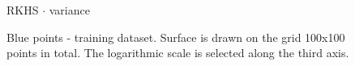 \documentclass[a4paper]{article}
\begin{document}
\begin{figure}[h]
\begin{minipage}[h]{0.49\linewidth}
\end{minipage}
\hfill
\begin{minipage}[h]{0.49\linewidth}
 RKHS $\cdot$ variance
\end{minipage}

\caption{Blue points - training dataset. Surface is drawn on the grid 100x100 points in total. The logarithmic scale is selected along the third axis.}
\label{surface_plots}
\end{figure}
\end{document}
